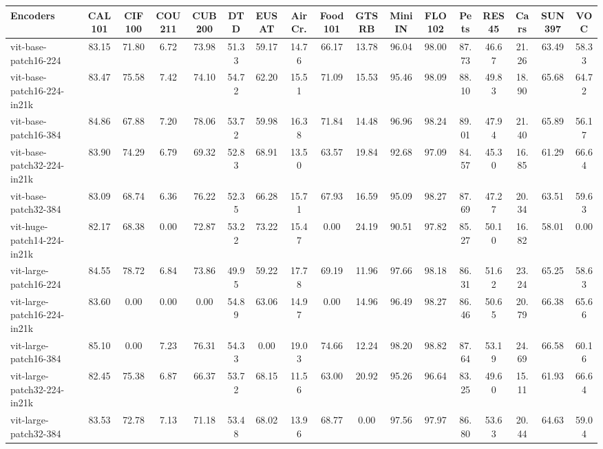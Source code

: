 \begin{tabular}{l cccccccccccccccc}
\toprule
Encoders & CAL101 & CIF100 & COU211 & CUB200 & DTD & EUSAT & AirCr. & Food101 & GTSRB & MiniIN & FLO102 & Pets & RES45 & Cars & SUN397 & VOC \\ \hline
vit-base-patch16-224 & 83.15 & 71.80 & 6.72 & 73.98 & 51.33 & 59.17 & 14.76 & 66.17 & 13.78 & 96.04 & 98.00 & 87.73 & 46.67 & 21.26 & 63.49 & 58.33\\
vit-base-patch16-224-in21k & 83.47 & 75.58 & 7.42 & 74.10 & 54.72 & 62.20 & 15.51 & 71.09 & 15.53 & 95.46 & 98.09 & 88.10 & 49.83 & 18.90 & 65.68 & 64.72\\
vit-base-patch16-384 & 84.86 & 67.88 & 7.20 & 78.06 & 53.72 & 59.98 & 16.38 & 71.84 & 14.48 & 96.96 & 98.24 & 89.01 & 47.94 & 21.40 & 65.89 & 56.17\\
vit-base-patch32-224-in21k & 83.90 & 74.29 & 6.79 & 69.32 & 52.83 & 68.91 & 13.50 & 63.57 & 19.84 & 92.68 & 97.09 & 84.57 & 45.30 & 16.85 & 61.29 & 66.64\\
vit-base-patch32-384 & 83.09 & 68.74 & 6.36 & 76.22 & 52.35 & 66.28 & 15.71 & 67.93 & 16.59 & 95.09 & 98.27 & 87.69 & 47.27 & 20.34 & 63.51 & 59.63\\
vit-huge-patch14-224-in21k & 82.17 & 68.38 & 0.00 & 72.87 & 53.22 & 73.22 & 15.47 & 0.00 & 24.19 & 90.51 & 97.82 & 85.27 & 50.10 & 16.82 & 58.01 & 0.00\\
vit-large-patch16-224 & 84.55 & 78.72 & 6.84 & 73.86 & 49.95 & 59.22 & 17.78 & 69.19 & 11.96 & 97.66 & 98.18 & 86.31 & 51.62 & 23.24 & 65.25 & 58.63\\
vit-large-patch16-224-in21k & 83.60 & 0.00 & 0.00 & 0.00 & 54.89 & 63.06 & 14.97 & 0.00 & 14.96 & 96.49 & 98.27 & 86.46 & 50.65 & 20.79 & 66.38 & 65.66\\
vit-large-patch16-384 & 85.10 & 0.00 & 7.23 & 76.31 & 54.33 & 0.00 & 19.03 & 74.66 & 12.24 & 98.20 & 98.82 & 87.64 & 53.19 & 24.69 & 66.58 & 60.16\\
vit-large-patch32-224-in21k & 82.45 & 75.38 & 6.87 & 66.37 & 53.72 & 68.15 & 11.56 & 63.00 & 20.92 & 95.26 & 96.64 & 83.25 & 49.60 & 15.11 & 61.93 & 66.64\\
vit-large-patch32-384 & 83.53 & 72.78 & 7.13 & 71.18 & 53.48 & 68.02 & 13.96 & 68.77 & 0.00 & 97.56 & 97.97 & 86.80 & 53.63 & 20.44 & 64.63 & 59.04\\
\bottomrule
\end{tabular}
